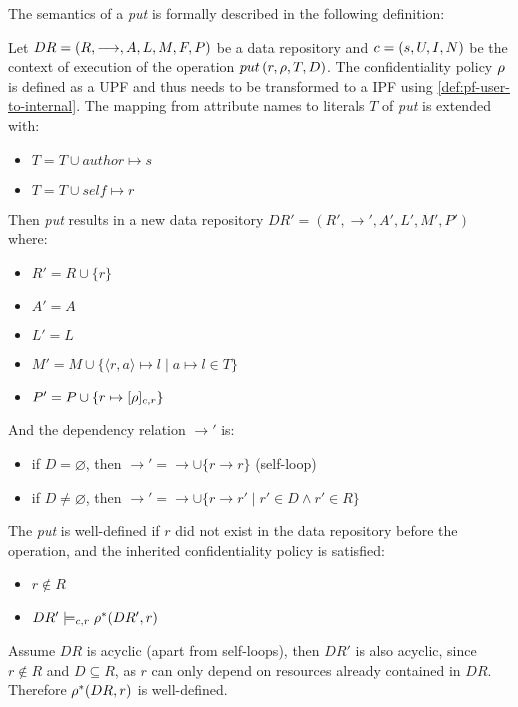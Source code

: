 The semantics of a \emph{put} is formally described in the following definition:
\begin{definition}
Let $DR= \left( R, \longrightarrow, A, L, M, F, P \right)$ be a data repository and $c = \left( s, U, I, N \right)$ be the context of execution of the operation $put \left( r, \rho, T, D \right)$. The confidentiality policy $\rho$ is defined as a UPF and thus needs to be transformed to a IPF using \autoref{def:pf-user-to-internal}. The mapping from attribute names to literals $T$ of \emph{put} is extended with: 
\begin{itemize}
    \item $T = T \cup author \mapsto s$
    \item $T = T \cup self \mapsto r$
\end{itemize}
Then \emph{put} results in a new data repository $DR'=\left(R', \longrightarrow', A', L', M', P' \right)$ where:
\begin{itemize}
    \item $R' = R \cup \{r\}$
    \item $A' = A$
    \item $L' = L$
    \item $M' = M \cup \{ \langle r,a \rangle \mapsto l \mid a \mapsto l \in T \}$
    \item $P' = P \cup \{ r \mapsto [\rho]_{c,r} \}$
\end{itemize}
And the dependency relation $\longrightarrow'$ is:
\begin{itemize}
    \item if $D = \varnothing$, then $\longrightarrow' = \longrightarrow \cup \{r \longrightarrow r\}$ (self-loop)
    \item if $D \neq \varnothing$, then $\longrightarrow' = \longrightarrow \cup \{r \longrightarrow r' \mid r' \in D \land r' \in R \}$
\end{itemize}
The \emph{put} is well-defined if $r$ did not exist in the data repository before the operation, and the inherited confidentiality policy is satisfied:
\begin{itemize}
    \item $r \not\in R$
    \item $DR' \models_{c,r} \rho^{\ast}(DR',r)$
\end{itemize}
Assume $DR$ is acyclic (apart from self-loops), then $DR'$ is also acyclic, since $r \notin R$ and $D \subseteq R$, as $r$ can only depend on resources already contained in $DR$. Therefore $\rho^{\ast}(DR,r)$ is well-defined.
\end{definition}

